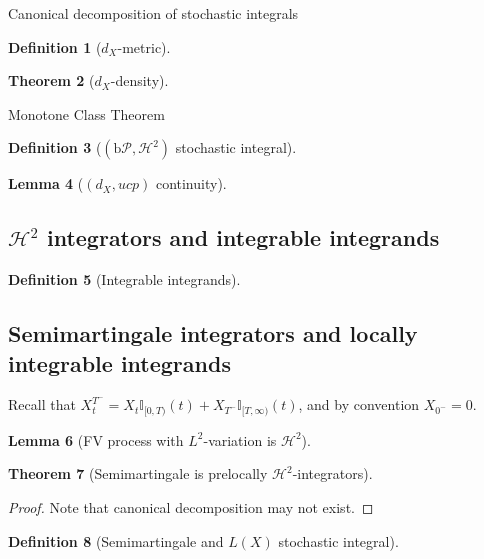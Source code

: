 \documentclass[openany,oneside]{book}
\newtheorem{thm}{Theorem}[section]
\newtheorem{lem}[thm]{Lemma}
\theoremstyle{definition}
\newtheorem{defn}[thm]{Definition}
\theoremstyle{remark}
\newcommand{\I}{\mathbb{I}} %
\newcommand{\sH}[1][2]{\mathcal{H}^{#1}} %
\newcommand{\pred}{\mathcal{P}} %
\newcommand{\bP}{\mathrm{b}\pred} %
\begin{document}
Canonical decomposition of stochastic integrals

\begin{defn}[$d_X$-metric]

\end{defn}

\begin{thm}[$d_X$-density]

\end{thm}
Monotone Class Theorem

\begin{defn}[$(\bP,\sH)$ stochastic integral]

\end{defn}

\begin{lem}[$(d_X,ucp)$ continuity]

\end{lem}

\subsection{$\sH$ integrators and integrable integrands}
\begin{defn}[Integrable integrands]

\end{defn}


\subsection{Semimartingale integrators and locally integrable integrands}
Recall that $X^{T^-}_t = X_t\I_{[0,T)}(t) + X_{T^-}\I_{[T,\infty)}(t)$, and by convention $X_{0^-}=0$.

\begin{lem}[FV process with $L^2$-variation is $\sH$]

\end{lem}

\begin{thm}[Semimartingale is prelocally $\sH$-integrators]

\end{thm}
\begin{proof}
Note that canonical decomposition may not exist.
\end{proof}

\begin{defn}[Semimartingale and $L(X)$ stochastic integral]

\end{defn}


\end{document}
